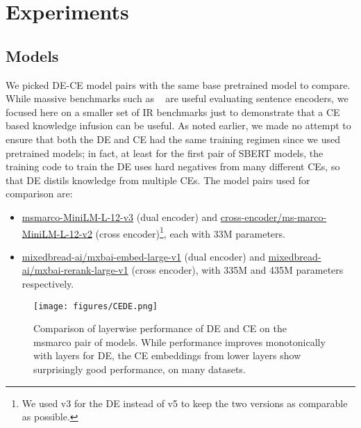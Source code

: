 \section{Experiments}
\subsection{Models}
\label{models}
We picked DE-CE model pairs with the same base pretrained model to compare. While massive benchmarks such as ~\cite{muennighoff2023mtebmassivetextembedding} are useful evaluating sentence encoders, we focused here on a smaller set of IR benchmarks just to demonstrate that a CE based knowledge infusion can be useful. As noted earlier, we made no attempt to ensure that both the DE and CE had the same training regimen since we used pretrained models; in fact, at least for the first pair of SBERT models, the training code to train the DE uses hard negatives from many different CEs, so that DE distils knowledge from multiple CEs. 
The model pairs used for comparison are:
\begin{itemize}[noitemsep,topsep=0pt]
    \item \href{https://www.sbert.net/docs/pretrained-models/msmarco-v3.html}{msmarco-MiniLM-L-12-v3} (dual encoder) and \href{https://huggingface.co/cross-encoder/ms-marco-MiniLM-L-12-v2}{cross-encoder/ms-marco-MiniLM-L-12-v2} (cross encoder)\footnote{We used v3 for the DE instead of v5 to keep the two versions as comparable as possible.}, each with 33M parameters.
    \item \href{https://huggingface.co/mixedbread-ai/mxbai-embed-large-v1} {mixedbread-ai/mxbai-embed-large-v1} (dual encoder) and \href{https://huggingface.co/mixedbread-ai/mxbai-rerank-large-v1}{mixedbread-ai/mxbai-rerank-large-v1} (cross encoder), with 335M and 435M parameters respectively.
\end{itemize}
%

\begin{figure}[!t]
    \centering
    \texttt{[image: figures/CEDE.png]}
    \caption{Comparison of layerwise performance of DE and CE on the msmarco pair of models. While performance improves monotonically with layers for DE, the CE embeddings from lower layers show surprisingly good performance, on many datasets.}
    \label{fig:msmarco_layer}
\end{figure}

